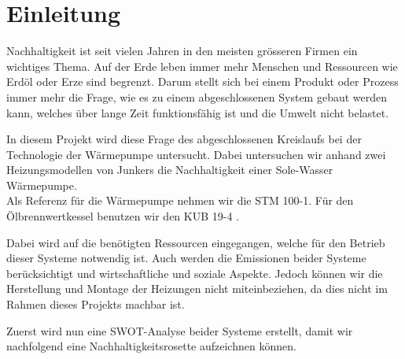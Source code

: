 \chapter{Einleitung}
\label{chap:einleitung}

Nachhaltigkeit ist seit vielen Jahren in den meisten grösseren Firmen ein wichtiges Thema. Auf der Erde leben immer mehr Menschen und Ressourcen wie Erdöl oder Erze sind begrenzt. Darum stellt sich bei einem Produkt oder Prozess immer mehr die Frage, wie es zu einem abgeschlossenen System gebaut werden kann, welches über lange Zeit funktionsfähig ist und die Umwelt nicht belastet.

In diesem Projekt wird diese Frage des abgeschlossenen Kreislaufs bei der Technologie der Wärmepumpe untersucht. Dabei untersuchen wir anhand zwei Heizungsmodellen von Junkers\cite{junkers:home} die Nachhaltigkeit einer Sole-Wasser Wärmepumpe. \\
Als Referenz für die Wärmepumpe nehmen wir die STM 100-1\cite{junkers:stm-100-1}. Für den Ölbrennwertkessel benutzen wir den KUB 19-4 \cite{junkers:kub-19-4}.

Dabei wird auf die benötigten Ressourcen eingegangen, welche für den Betrieb dieser Systeme notwendig ist. Auch werden die Emissionen beider Systeme berücksichtigt und wirtschaftliche und soziale Aspekte.
Jedoch können wir die Herstellung und Montage der Heizungen nicht miteinbeziehen, da dies nicht im Rahmen dieses Projekts machbar ist.

Zuerst wird nun eine SWOT-Analyse beider Systeme erstellt, damit wir nachfolgend eine Nachhaltigkeitsrosette aufzeichnen können.






